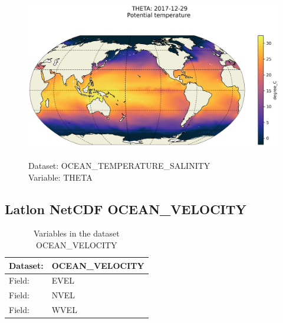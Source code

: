 \begin{figure}[H]
\centering
\includegraphics[scale=0.5]{../images/plots/latlon_plots/Ocean_Temperature_and_Salinity/THETA.png}
\caption{\\Dataset: OCEAN\_TEMPERATURE\_SALINITY\\Variable: THETA}
\label{tab:table-OCEAN_TEMPERATURE_SALINITY_THETA-Plot}
\end{figure}
\pagebreak
\subsection{Latlon NetCDF OCEAN\_VELOCITY}
\newp
\begin{longtable}{|p{}|p{}|}
\caption{Variables in the dataset OCEAN\_VELOCITY}
\label{tab:table-OCEAN_VELOCITY-fields} \\ 
\hline \endhead \hline \endfoot
\rowcolor{lightgray} \textbf{Dataset:} & \textbf{OCEAN\_VELOCITY} \\ \hline
Field: &EVEL \\ \hline
Field: &NVEL \\ \hline
Field: &WVEL \\ \hline
\end{longtable}

\pagebreak
